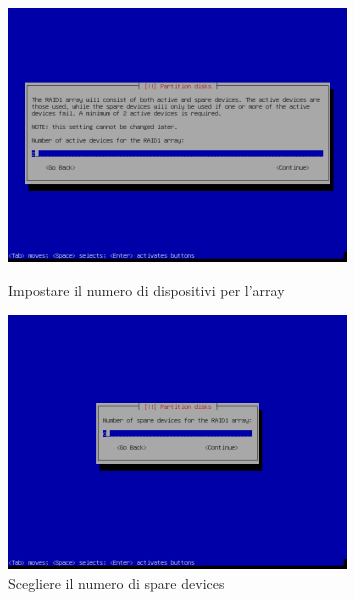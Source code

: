 \documentclass[11pt]{article}
\begin{document}
\begin{figure}[H]
    \includegraphics[width=0.8\textwidth, keepaspectratio]{../img/raid install/raid13.png}
    \centering
    \caption{Impostare il numero di dispositivi per l'array}

    \includegraphics[width=0.8\textwidth, keepaspectratio]{../img/raid install/raid14.png}
    \centering
    \caption{Scegliere il numero di spare devices}
\end{figure}
\end{document}
